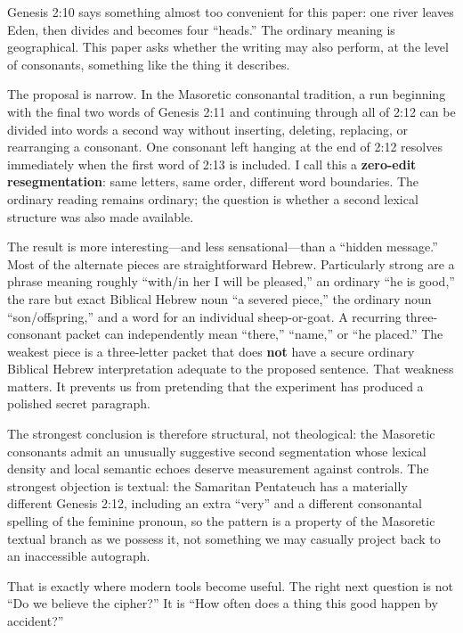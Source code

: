 \ArticleTitleBlock
\begin{JournalAbstract}

Genesis 2:10 says something almost too convenient for this paper: one river leaves Eden, then divides and becomes four ``heads.'' The ordinary meaning is geographical. This paper asks whether the writing may also perform, at the level of consonants, something like the thing it describes.

The proposal is narrow. In the Masoretic consonantal tradition, a run beginning with the final two words of Genesis 2:11 and continuing through all of 2:12 can be divided into words a second way without inserting, deleting, replacing, or rearranging a consonant. One consonant left hanging at the end of 2:12 resolves immediately when the first word of 2:13 is included. I call this a \textbf{zero-edit resegmentation}: same letters, same order, different word boundaries. The ordinary reading remains ordinary; the question is whether a second lexical structure was also made available.

The result is more interesting---and less sensational---than a ``hidden message.'' Most of the alternate pieces are straightforward Hebrew. Particularly strong are a phrase meaning roughly ``with/in her I will be pleased,'' an ordinary ``he is good,'' the rare but exact Biblical Hebrew noun ``a severed piece,'' the ordinary noun ``son/offspring,'' and a word for an individual sheep-or-goat. A recurring three-consonant packet can independently mean ``there,'' ``name,'' or ``he placed.'' The weakest piece is a three-letter packet that does \textbf{not} have a secure ordinary Biblical Hebrew interpretation adequate to the proposed sentence. That weakness matters. It prevents us from pretending that the experiment has produced a polished secret paragraph.

The strongest conclusion is therefore structural, not theological: the Masoretic consonants admit an unusually suggestive second segmentation whose lexical density and local semantic echoes deserve measurement against controls. The strongest objection is textual: the Samaritan Pentateuch has a materially different Genesis 2:12, including an extra ``very'' and a different consonantal spelling of the feminine pronoun, so the pattern is a property of the Masoretic textual branch as we possess it, not something we may casually project back to an inaccessible autograph.\cite{MasoreticGenesis,SamaritanGenesis,Naaijer2024,Hjelm2020}

That is exactly where modern tools become useful. The right next question is not ``Do we believe the cipher?'' It is ``How often does a thing this good happen by accident?''

\end{JournalAbstract}
